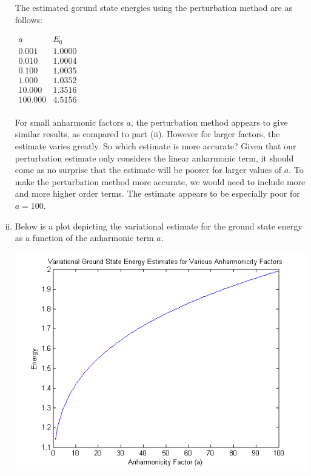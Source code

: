 \documentclass{article}
\begin{document}
\begin{enumerate}[i)]
    The estimated gorund state energies using the perturbation method are as follows:
    \begin{center}
      $\begin{array}{c|c}
        a & E_0 \\ \hline
        0.001 & 1.0000 \\ 
        0.010 & 1.0004 \\ 
        0.100 & 1.0035 \\ 
        1.000 & 1.0352 \\ 
        10.000 & 1.3516 \\ 
        100.000 & 4.5156 \\
      \end{array}$
    \end{center}

    For small anharmonic factors $a$, the perturbation method appears to give similar results, as compared to part (ii). However for larger factors, the estimate varies greatly. So which estimate is more accurate? Given that our perturbation estimate only considers the linear anharmonic term, it should come as no surprise that the estimate will be poorer for larger values of $a$. To make the perturbation method more accurate, we would need to include more and more higher order terms. The estimate appears to be especially poor for $a=100$.

  \item Below is a plot depicting the variational estimate for the ground state energy as a function of the anharmonic term $a$.
    \begin{center}
      \includegraphics[scale=0.75]{prob1part4}
    \end{center}


\end{enumerate}
\end{document}
